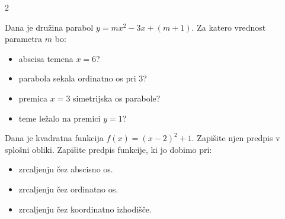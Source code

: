         \begin{multicols}{2}
            

            \begin{naloga}
                Dana je družina parabol $y=mx^2-3x+(m+1)$. 
                Za katero vrednost parametra $m$ bo:
                
                    \begin{itemize}
                        \item abscisa temena $x=6$?
                        \item parabola sekala ordinatno os pri $3$?
                        \item premica $x=3$ simetrijska os parabole?
                        \item teme ležalo na premici $y=1$?

                    \end{itemize}

            \end{naloga}

            
            \begin{naloga}
                Dana je kvadratna funkcija $f(x)=\left(x-2\right)^2+1$.
                Zapišite njen predpis v splošni obliki.
                Zapišite predpis funkcije, ki jo dobimo pri: 
                
                    \begin{itemize}
                        \item zrcaljenju čez abscisno os.
                        \item zrcaljenju čez ordinatno os.
                        \item zrcaljenju čez koordinatno izhodišče.
                    \end{itemize}

            \end{naloga}

    
        \end{multicols}



